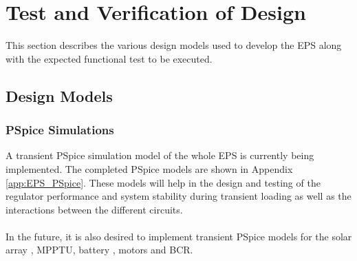 \section{Test and Verification of Design}
\label{sec:test_verification}
This section describes the various design models used to develop the \ac{EPS} along with the expected functional test to be executed.
%
\subsection{Design Models}
%
\subsubsection{PSpice Simulations}
A transient PSpice simulation model of the whole \ac{EPS} is currently being implemented. The completed PSpice models are shown in Appendix \ref{app:EPS_PSpice}. These models will help in the design and testing of the regulator performance and system stability during transient loading as well as the interactions between the different circuits.
\\
\\
In the future, it is also desired to implement transient PSpice models for the solar array \cite{Castaner}, \ac{MPPTU}, battery \cite{gold}, motors and \ac{BCR}.
%
